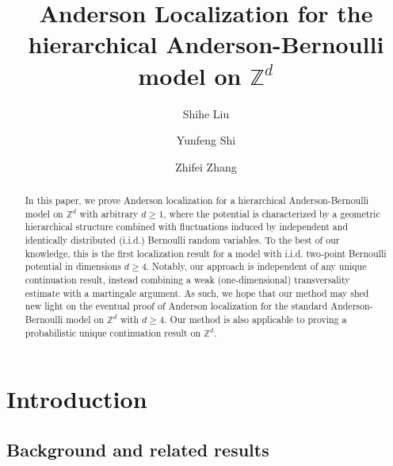 \documentclass[11pt,reqno,UTF8,twoside]{amsart}
\newcommand{\Z}{\mathbb{Z}}
\theoremstyle{definition}
\numberwithin{equation}{section}
\begin{document}
\title[hierarchical Anderson Bernoulli Model]{Anderson Localization for the hierarchical Anderson-Bernoulli model on $\Z^d$}


\author[Liu]{Shihe Liu}
\address[S. Liu] {School of Mathematical Sciences,
Peking University,
Beijing 100871,
China}

\author[Shi]{Yunfeng Shi}
\address[Y. Shi] {School of Mathematics,
Sichuan University,
Chengdu 610064,
China}

\author[Zhang]{Zhifei Zhang}
\address[Z. Zhang] {School of Mathematical Sciences,
Peking University,
Beijing 100871,
China}



\begin{abstract}
In this paper, we prove Anderson localization for a hierarchical Anderson-Bernoulli model on $\mathbb{Z}^d$ with arbitrary $d\geq 1$, where the potential is characterized by a geometric hierarchical structure combined with fluctuations induced by independent and identically distributed (i.i.d.) Bernoulli random variables. To the best of our knowledge, this is the first localization result for a model with i.i.d. two‑point Bernoulli potential in dimensions $d\geq 4$.  Notably, our approach is independent of any unique continuation result, instead combining a weak (one-dimensional) transversality estimate with a martingale argument. As such, we hope that our method may shed new light on the eventual proof of Anderson localization for the standard Anderson-Bernoulli model  on $\Z^d$ with $d\geq 4.$ Our method is also applicable to proving a probabilistic unique continuation result on $\Z^d$.
\end{abstract}

\maketitle

\tableofcontents

\section{Introduction}


\subsection{Background and related results}
\end{document}
